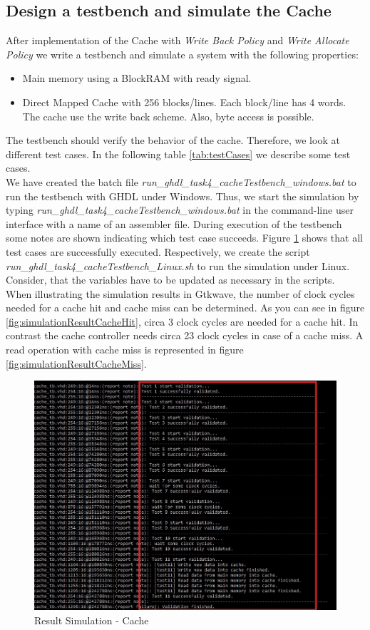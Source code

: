 \subsection{Design a testbench and simulate the Cache}
\label{sec:testbenchSimulationCache}
After implementation of the Cache with \textit{Write Back Policy} and \textit{Write Allocate Policy} we write a testbench and simulate a system with the following properties:
\begin{itemize} 
	\item Main memory using a BlockRAM with ready signal.
	\item Direct Mapped Cache with 256 blocks/lines. Each block/line has 4 words. The cache use the write back scheme. Also, byte access is possible.	
\end{itemize}
The testbench should verify the behavior of the cache. Therefore, we look at different test cases. In the following table \ref{tab:testCases} we describe some test cases.\\
We have created the batch file \textit{run\_ghdl\_task4\_cacheTestbench\_windows.bat} to run the testbench with GHDL under Windows. Thus, we start the simulation by typing \textit{run\_ghdl\_task4\_cacheTestbench\_windows.bat} in the command-line user interface with a name of an assembler file. During execution of the testbench some notes are shown indicating which test case succeeds. Figure \ref{fig:simulationResult} shows that all test cases are successfully executed. Respectively, we create the script \textit{run\_ghdl\_task4\_cacheTestbench\_Linux.sh} to run the simulation under Linux. Consider, that the variables have to be updated as necessary in the scripts.\\
When illustrating the simulation results in Gtkwave, the number of clock cycles needed for a cache hit and cache miss can be determined. As you can see in figure \ref{fig:simulationResultCacheHit}, circa 3 clock cycles are needed for a cache hit. In contrast the cache controller needs circa 23 clock cycles in case of a cache miss. A read operation with cache miss is represented in figure \ref{fig:simulationResultCacheMiss}.
\begin{figure}
	\centering
	\includegraphics[scale=.5]{pictures/simulationResult}
	\caption{Result Simulation - Cache}
	\label{fig:simulationResult}
\end{figure}
